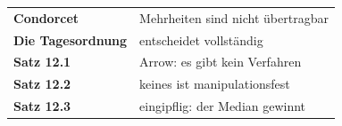 \begin{merksatz}
\begin{center}
\renewcommand{\arraystretch}{1.5}
\begin{tabular}{@{}P{3.0cm}P{5.6cm}@{}}
\toprule
\textbf{Condorcet} & Mehrheiten sind nicht übertragbar\\
\textbf{Die Tagesordnung} & entscheidet vollständig\\
\textbf{Satz 12.1} & Arrow: es gibt kein Verfahren\\
\textbf{Satz 12.2} & keines ist manipulationsfest\\
\textbf{Satz 12.3} & eingipflig: der Median gewinnt\\
\bottomrule
\end{tabular}
\end{center}

\begin{center}
\begin{minipage}{0.88\textwidth}
\end{minipage}
\end{center}
\end{merksatz}
